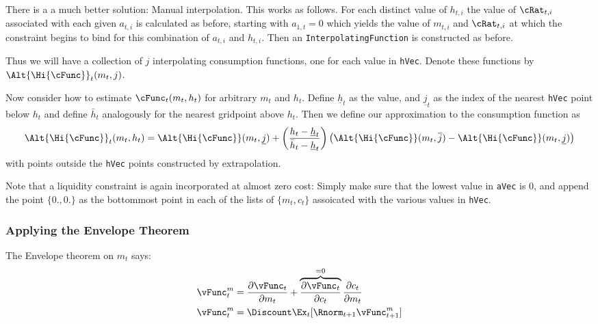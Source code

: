 \documentclass[titlepage]{\econtex}
\begin{document}
{  There is a a much better solution: Manual interpolation.  This works
  as follows.  For each distinct value of $h_{t,i}$ the value of
  ${\cRat}_{t,i}$ associated with each given ${a}_{t,i}$ is
  calculated as before, starting with ${a}_{1,t}=0$ which yields
  the value of ${m}_{t,i}$ and ${\cRat}_{t,i}$ at which the
  constraint begins to bind for this combination of ${a}_{t,i}$
  and $h_{t,i}$.  Then an \texttt{InterpolatingFunction} is
  constructed as before.

  Thus we will have a collection of $j$ interpolating consumption
  functions, one for each value in \texttt{hVec}.  Denote these
  functions by $\Alt{\Hi{\cFunc}}_{t}({m}_{t},j)$.

  Now consider how to estimate $\cFunc_{t}({m}_{t},h_{t})$ for arbitrary
  ${m}_{t}$ and $h_{t}$.  Define $\underline{h}_{t}$ as the value, and
  $\underline{j}_{t}$ as the index of the nearest \texttt{hVec} point
  below $h_{t}$ and define $\bar{h}_{t}$ analogously for the nearest
  gridpoint above $h_{t}$.  Then we define our approximation to the
  consumption function as
  \begin{displaymath}
    \Alt{\Hi{\cFunc}}_{t}({m}_{t},h_{t}) =
    \Alt{\Hi{\cFunc}}({m}_{t},\underline{j})+\left(\frac{h_{t}-\underline{h}_{t}}
      {\bar{h}_{t}-\underline{h}_{t}}\right)
    \left(\Alt{\Hi{\cFunc}}({m}_{t},\overline{j})
      -\Alt{\Hi{\cFunc}}({m}_{t},\underline{j})\right)
  \end{displaymath}
  with points outside the \texttt{hVec} points constructed by
  extrapolation.

  Note that a liquidity constraint is again incorporated at almost
  zero cost: Simply make sure that the lowest value in
  \texttt{aVec} is 0, and append the point $\{0.,0.\}$ as the
  bottommost point in each of the lists of $\{{m}_{t},{c}_{t}\}$
  assoicated with the various values in \texttt{hVec}.

  \hypertarget{Applying-the-Envelope-Theorem}{}
  \subsubsection{Applying the Envelope Theorem}
  The Envelope theorem on ${m}_{t}$ says:
  \begin{equation}\begin{gathered}\begin{aligned}
    {\vFunc}^{m}_{t}  & = \frac{\partial {\vFunc}_{t}}{\partial {m}_{t}} + \overbrace{\frac{\partial {\vFunc}_{t}}{\partial {c}_{t}}}^{=0}\frac{\partial {c}_{t}}{\partial {m}_{t}} \label{eq:vxt} \\
    {\vFunc}_{t}^{m}  & = \Discount  \Ex_{t} [\Rnorm_{t+1} {\vFunc}_{t+1}^{m}] \label{eq:envelopex}
  \end{aligned}\end{gathered}\end{equation}

}
\end{document}
